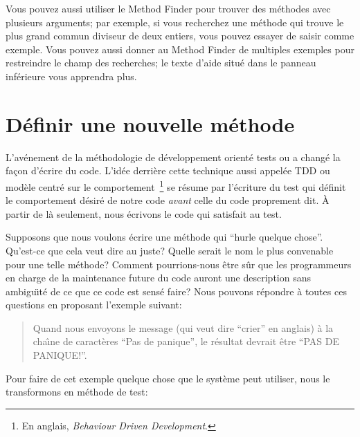 \documentclass[a4paper,10pt,twoside]{book}
\begin{document}
Vous pouvez aussi utiliser le Method Finder pour trouver des
m\'ethodes avec plusieurs arguments; par exemple, si vous recherchez
une m\'ethode qui trouve le plus grand commun diviseur de deux
entiers, vous pouvez essayer de saisir  comme exemple.
Vous pouvez aussi donner au Method Finder de multiples exemples pour
restreindre le champ des recherches; le texte d'aide situ\'e dans le
panneau inf\'erieure vous apprendra plus.

\section{D\'efinir une nouvelle m\'ethode}
L'av\'enement de la m\'ethodologie de d\'eveloppement orient\'e tests
ou \cite{Beck03a} a chang\'e la
fa\c{c}on d'\'ecrire du code.
L'id\'ee derri\`ere cette technique aussi appel\'ee TDD ou
mod\`ele centr\'e sur le comportement~\footnote{En anglais,
  \emph{Behaviour Driven Development}.} se r\'esume par l'\'ecriture
du test qui d\'efinit le comportement d\'esir\'e de notre
code \emph{avant} celle du code proprement dit.
\`A partir de l\`a seulement, nous \'ecrivons le code qui satisfait au
test.

Supposons que nous voulons \'ecrire une m\'ethode qui ``hurle quelque
chose''. Qu'est-ce que cela veut dire au juste? Quelle serait le nom
le plus convenable pour une telle m\'ethode? Comment pourrions-nous
\^etre s\^ur que les programmeurs en charge de la maintenance future
du code auront une description sans ambigu\"{\i}t\'e de ce que ce code
est sens\'e faire?
Nous pouvons r\'epondre \`a toutes ces questions en proposant
l'exemple suivant:

\begin{quote}
Quand nous envoyons le message  (qui veut dire ``crier'' en anglais)
\`a la cha\^{\i}ne de caract\`eres ``Pas de panique'', le r\'esultat
devrait \^etre ``PAS DE PANIQUE!''.
\end{quote}

\noindent
Pour faire de cet exemple quelque chose que le syst\`eme peut
utiliser, nous le transformons en m\'ethode de test:
\end{document}
